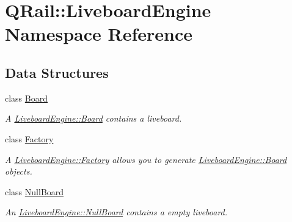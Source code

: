 \hypertarget{namespaceQRail_1_1LiveboardEngine}{}\section{Q\+Rail\+::Liveboard\+Engine Namespace Reference}
\label{namespaceQRail_1_1LiveboardEngine}
\subsection*{Data Structures}
\begin{DoxyCompactItemize}
\item 
class \mbox{\hyperlink{classQRail_1_1LiveboardEngine_1_1Board}{Board}}
\begin{DoxyCompactList}\small\item\em A \mbox{\hyperlink{classQRail_1_1LiveboardEngine_1_1Board}{Liveboard\+Engine\+::\+Board}} contains a liveboard. \end{DoxyCompactList}\item 
class \mbox{\hyperlink{classQRail_1_1LiveboardEngine_1_1Factory}{Factory}}
\begin{DoxyCompactList}\small\item\em A \mbox{\hyperlink{classQRail_1_1LiveboardEngine_1_1Factory}{Liveboard\+Engine\+::\+Factory}} allows you to generate \mbox{\hyperlink{classQRail_1_1LiveboardEngine_1_1Board}{Liveboard\+Engine\+::\+Board}} objects. \end{DoxyCompactList}\item 
class \mbox{\hyperlink{classQRail_1_1LiveboardEngine_1_1NullBoard}{Null\+Board}}
\begin{DoxyCompactList}\small\item\em An \mbox{\hyperlink{classQRail_1_1LiveboardEngine_1_1NullBoard}{Liveboard\+Engine\+::\+Null\+Board}} contains a empty liveboard. \end{DoxyCompactList}\end{DoxyCompactItemize}
